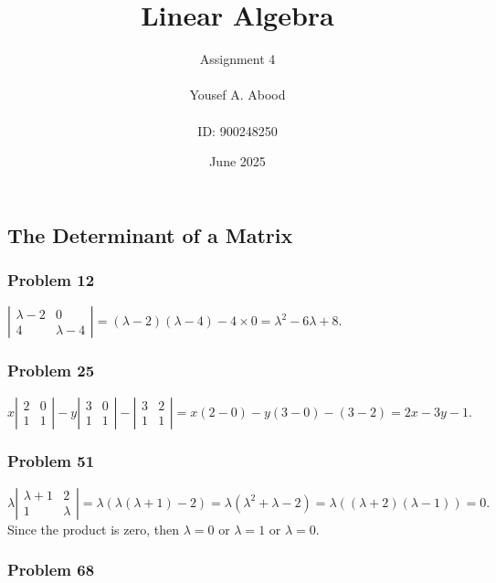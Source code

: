 \documentclass[a4paper,12pt]{article}
\title{Linear Algebra}
\author{Assignment 4\\ \\ Yousef A. Abood\\ \\ ID: 900248250}
\date{June 2025}
\begin{document}
\maketitle
\noindent\makebox[\linewidth]{\rule{15cm}{0.4pt}}
\subsection{The Determinant of a Matrix}
\subsubsection*{Problem 12}
$
\left |\begin{array}{cc}
    \lambda-2&0\\
    4   & \lambda-4
\end{array}\right | = (\lambda-2)(\lambda-4)-4 \times 0= \lambda^2 -6\lambda+8.
$
\subsubsection*{Problem 25}
$
x \left |\begin{array}{cc}
    2&0\\
    1&1
\end{array}\right | - y \left |\begin{array}{cc}
    3&0\\
    1&1
\end{array}\right |-\left |\begin{array}{cc}
    3&2\\
    1&1
\end{array}\right | = x(2-0)-y(3-0)-(3-2)=2x-3y-1.
$
\subsubsection*{Problem 51}
$
\lambda \left |\begin{array}{cc}
    \lambda+1&2\\
    1& \lambda
\end{array}\right | = \lambda (\lambda(\lambda +1)-2)=\lambda (\lambda^2 +\lambda-2)=\lambda ((\lambda+2)(\lambda-1))=0.
$ Since the product is zero, then $\lambda=0$ or $\lambda=1$ or $\lambda=0.$
\subsubsection*{Problem 68}
\end{document}
